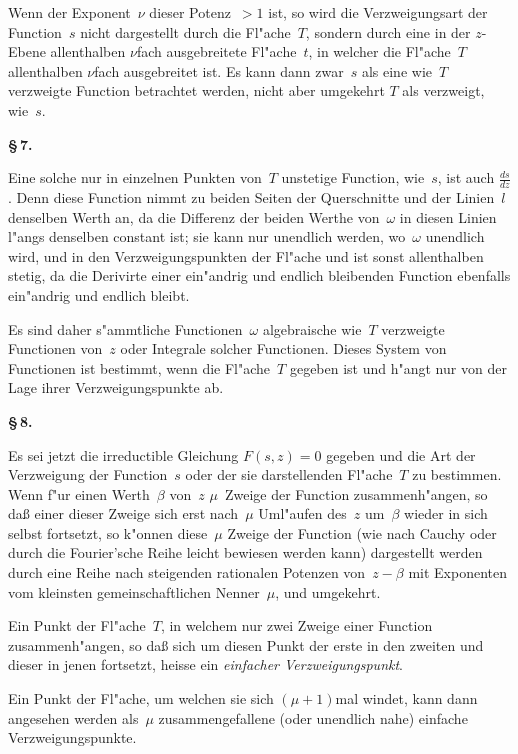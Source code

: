 \documentclass[12pt,a4paper]{book}
\theoremstyle{definition}
\theoremstyle{remark}
\begin{document}
Wenn der Exponent~$\nu$ dieser Potenz~$> 1$ ist, so wird die
Verzweigungsart der Function~$s$ nicht dargestellt durch die Fl"ache~$T$,
sondern durch eine in der $z$-Ebene allenthalben $\nu$fach ausgebreitete
Fl"ache~$t$, in welcher die Fl"ache~$T$ allenthalben $\nu$fach ausgebreitet ist.
Es kann dann zwar~$s$ als eine wie~$T$ verzweigte Function betrachtet
werden, nicht aber umgekehrt $T$ als verzweigt, wie~$s$.

\medskip
\textbf{\S\,7.}

Eine solche nur in einzelnen Punkten von~$T$ unstetige Function,
wie~$s$, ist auch $\displaystyle\frac{ds}{dz}$. Denn diese Function nimmt zu beiden
Seiten der Querschnitte und der Linien~$l$ denselben Werth an, da die
Differenz der beiden Werthe von~$\omega$ in diesen Linien l"angs denselben
constant ist; sie kann nur unendlich werden, wo~$\omega$ unendlich wird,
und in den Verzweigungspunkten der Fl"ache und ist sonst allenthalben
stetig, da die Derivirte einer ein"andrig und endlich bleibenden Function
ebenfalls ein"andrig und endlich bleibt.

Es sind daher s"ammtliche Functionen~$\omega$ algebraische wie~$T$
verzweigte Functionen von~$z$ oder Integrale solcher Functionen.
Dieses System von Functionen ist bestimmt, wenn die Fl"ache~$T$ gegeben
ist und h"angt nur von der Lage ihrer Verzweigungspunkte ab.

\medskip
\textbf{\S\,8.}

Es sei jetzt die irreductible Gleichung $F(s,z) = 0$ gegeben und die
Art der Verzweigung der Function~$s$ oder der sie darstellenden Fl"ache~$T$
zu bestimmen. Wenn f"ur einen Werth~$\beta$ von~$z$ $\mu$~Zweige der Function
zusammenh"angen, so da\ss{} einer dieser Zweige sich erst nach~$\mu$ Uml"aufen
des~$z$ um~$\beta$ wieder in sich selbst fortsetzt, so k"onnen diese~$\mu$ Zweige
der Function (wie nach Cauchy oder durch die Fourier'sche Reihe leicht
bewiesen werden kann) dargestellt werden durch eine Reihe nach steigenden
rationalen Potenzen von~$z - \beta$ mit Exponenten vom kleinsten
gemeinschaftlichen Nenner~$\mu$, und umgekehrt.

Ein Punkt der Fl"ache~$T$, in welchem nur zwei Zweige einer Function
zusammenh"angen, so da\ss{} sich um diesen Punkt der erste in den zweiten
und dieser in jenen fortsetzt, heisse ein \emph{einfacher Verzweigungspunkt}.

Ein Punkt der Fl"ache, um welchen sie sich $(\mu+1)$mal windet,
kann dann angesehen werden als~$\mu$ zusammengefallene (oder unendlich
nahe) einfache Verzweigungspunkte.
\end{document}
